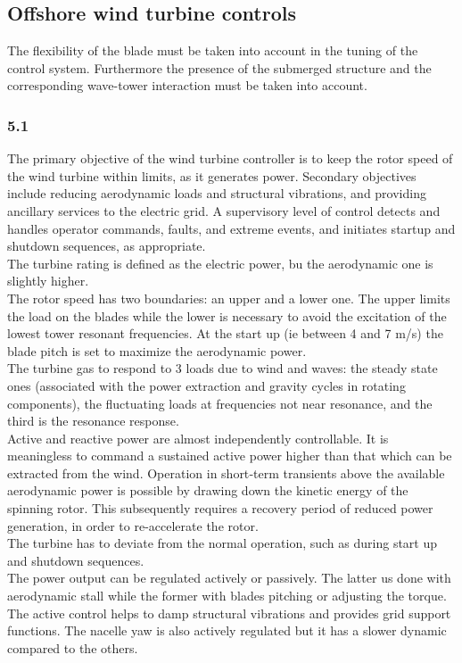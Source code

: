 \documentclass[]{article}
\begin{document}
\subsection{Offshore wind turbine controls}
The flexibility of the blade must be taken into account in the tuning of the control system. Furthermore the presence of the submerged structure and the corresponding wave-tower interaction must be taken into account.
\subsubsection{5.1}
The primary objective of the wind turbine controller is to keep the rotor speed of the
wind turbine within limits, as it generates power. Secondary objectives include reducing
aerodynamic loads and structural vibrations, and providing ancillary services to the
electric grid. A supervisory level of control detects and handles operator commands,
faults, and extreme events, and initiates startup and shutdown sequences, as appropriate.\\
The turbine rating is defined as the electric power, bu the aerodynamic one is slightly higher.\\
The rotor speed has two boundaries: an upper and a lower one. The upper limits the load on the blades while the lower is necessary to avoid the excitation of the lowest tower resonant frequencies. At the start up (ie between 4 and 7 m/s) the blade pitch is set to maximize the aerodynamic power.\\
The turbine gas to respond to 3 loads due to wind and waves: the steady state ones (associated with the power extraction and gravity cycles in rotating components), the fluctuating loads at frequencies not near resonance, and the third is the resonance response.\\ 
Active and reactive power are almost independently controllable. It is meaningless to command a sustained active power higher than that which can be extracted from the wind. Operation in short‐term transients above the available aerodynamic power is possible by drawing down the kinetic energy of the spinning rotor. This subsequently requires a recovery period of reduced power generation, in order to re-accelerate the rotor.\\
The turbine has to deviate from the normal operation, such as during start up and shutdown sequences.\\
The power output can be regulated actively or passively. The latter us done with aerodynamic stall while the former with blades pitching or adjusting the torque. The active control helps to damp structural vibrations and provides grid support functions. The nacelle yaw is also actively regulated but it has a slower dynamic compared to the others.
\end{document}
